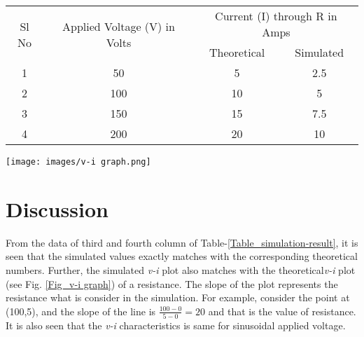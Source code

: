 \begin{minipage}{\textwidth}
    \begin{minipage}[b]{0.6\textwidth}
        \centering
        \begin{tabular}{|c|c|c|c|}
            \hline
            \multirow{2}{*}{Sl No} & \multirow{2}{*}{Applied Voltage (V) in Volts} & \multicolumn{2}{c|}{Current (I) through R in Amps}             \\
            \cline{3-4}
                                   &                                               & Theoretical                                        & Simulated \\
            \hline
            1                      & 50                                            & 5                                                  & 2.5       \\
            \hline
            2                      & 100                                           & 10                                                 & 5         \\
            \hline
            3                      & 150                                           & 15                                                 & 7.5       \\
            \hline
            4                      & 200                                           & 20                                                 & 10        \\
            \hline
        \end{tabular}
        \label{Table_simulation-result}
    \end{minipage}
    \hfill
    \begin{minipage}[b]{0.49\textwidth}
        \centering
        \texttt{[image: images/v-i graph.png]}
        \label{Fig_v-i graph}
    \end{minipage}
\end{minipage}

\section{Discussion}
\hspace{1.5cm} From the data of third and fourth column of Table-\ref{Table_simulation-result}, it is seen that the simulated values exactly matches with the corresponding theoretical numbers. Further, the simulated \textit{v-i} plot also matches with the theoretical\textit{v-i} plot (see Fig. \ref{Fig_v-i graph}) of a resistance. The slope of the plot represents the resistance what is consider in the simulation. For example, consider the point at (100,5), and the slope of the line is $\frac{100-0}{5-0}=20$ and that is the value of resistance. It is also seen that the \textit{v-i} characteristics is same for sinusoidal applied voltage.

